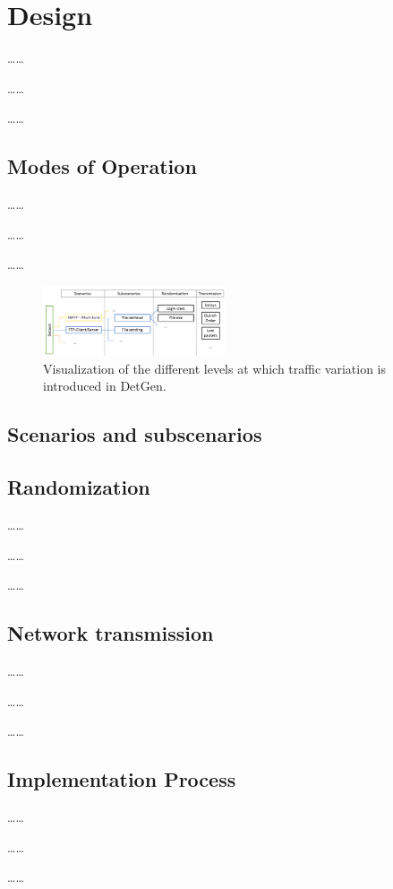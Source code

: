\documentclass[sigconf]{acmart}
\begin{document}
\section{Design}\label{Sec:Design}
\dots \dots

\dots \dots

\dots \dots
\subsection{Modes of Operation}
\dots \dots

\dots \dots

\dots \dots

\begin{figure}
 \centering 
 \includegraphics[width=0.480\textwidth]{images/scenario_branching.PNG}
 \caption{Visualization of the different levels at which traffic variation is introduced in DetGen.}
 \label{Fig:branching}
\end{figure}


\subsection{Scenarios and subscenarios}
\label{Sec:Scenarios}

\subsection{Randomization}\label{Sec:randomsubscen}
\dots \dots

\dots \dots

\dots \dots
\subsection{Network transmission}\label{Sec:Netrand}
\dots \dots

\dots \dots

\dots \dots

\subsection{Implementation Process}
\dots \dots

\dots \dots

\dots \dots
 
\end{document}
